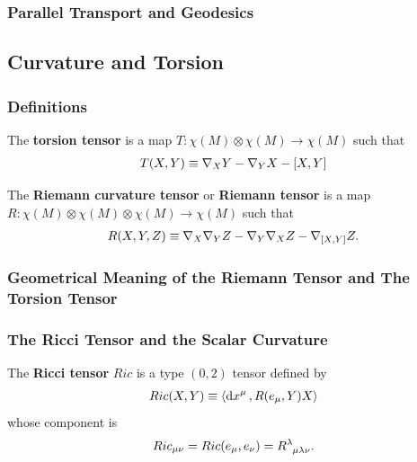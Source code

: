 \documentclass[10pt]{article}
\begin{document}
\subsubsection{Parallel Transport and Geodesics}

\subsection{Curvature and Torsion}
\subsubsection{Definitions}
\begin{definition}
    The \textbf{torsion tensor} is a map $T:\chi(M)\otimes\chi(M)\to\chi(M)$ such that
    \begin{align}
        T(X,Y)\equiv\nabla_X Y-\nabla_Y X-\comm{X}{Y}\label{eq:torsiondefinition}
    \end{align}
\end{definition}
\begin{definition}
    The \textbf{Riemann curvature tensor} or \textbf{Riemann tensor} is a map $R:\chi(M)\otimes\chi(M)\otimes\chi(M)\to\chi(M)$ such that
    \begin{align}
        R(X,Y,Z)\equiv\nabla_X\nabla_Y Z-\nabla_Y\nabla_X Z-\nabla_{\comm{X}{Y}}Z.
    \end{align}
\end{definition}
\subsubsection{Geometrical Meaning of the Riemann Tensor and The Torsion Tensor}
\subsubsection{The Ricci Tensor and the Scalar Curvature}
\begin{definition}
    The \textbf{Ricci tensor} $Ric$ is a type $(0,2)$ tensor defined by
    \begin{align}
        Ric(X,Y)\equiv\expval{\dd{x^\mu},R(e_\mu,Y)X}
    \end{align}
    whose component is
    \begin{align}
        Ric_{\mu\nu}=Ric(e_\mu,e_\nu)=\tensor{R}{^\lambda_\mu_\lambda_\nu}.
    \end{align}
\end{definition}
\end{document}
